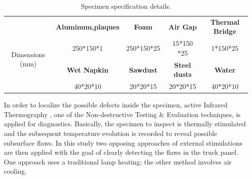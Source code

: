 \documentclass{tQRT2e}
\begin{document}
\begin{table}
	\centering

	\caption{Specimen specification details.}
	\begin{tabular}{c|c|c|c|c}
		\hline
		& \textbf{Aluminum,plaques} & \textbf{Foam}       & \textbf{Air Gap}     & \textbf{Thermal Bridge} \\ \cline{2-5} 
		\multirow{2}{*}{Dimensions (mm)} & 250*150*1        & 250*150*25 & 15*150 *25  & 1*150*25       \\ \cline{2-5} 
		& \textbf{Wet Napkin}       & \textbf{Sawdust}    & \textbf{Steel dusts} & \textbf{Water}          \\ \cline{2-5} 
		& 40*20*10         & 20*20*15   & 20*20*15    & 40*20*10       \\ \hline
	\end{tabular}
	\label{Tab_spe}
\end{table}
In order to localize the possible defects inside the specimen, active Infrared Thermography \cite{Maldague2001theory,Balageas2016}, one of the Non-destructive Testing \& Evaluation techniques, is applied for diagnostics. Basically, the specimen to inspect is thermally stimulated and the subsequent temperature evolution is recorded to reveal possible subsurface ﬂaws. In this study two opposing approaches of external stimulations are then applied with the goal of clearly detecting the flaws in the truck panel. One approach uses a traditional lamp heating; the other method involves air cooling. 
\end{document}
